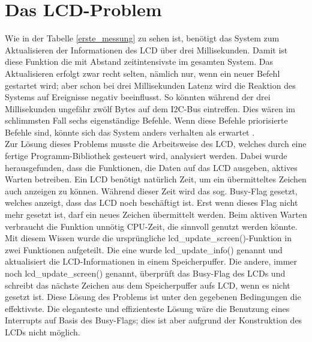 \section{Das LCD-Problem\label{chapter_lcd_problem}}
Wie in der Tabelle \ref{erste_messung} zu sehen ist, benötigt das System zum Aktualisieren der Informationen
des LCD über drei Millisekunden. Damit ist diese Funktion die mit Abstand zeitintensivste im gesamten System.
Das Aktualisieren erfolgt zwar recht selten, nämlich nur, wenn ein neuer Befehl gestartet wird; aber schon
bei drei Millisekunden Latenz wird die Reaktion des Systems auf Ereignisse negativ beeinflusst.
So könnten während der drei Millisekunden ungefähr zwölf Bytes auf dem I2C-Bus eintreffen.
Dies wären im schlimmsten Fall sechs eigenständige Befehle.
Wenn diese Befehle priorisierte Befehle sind, könnte sich das System anders verhalten als erwartet .\\
Zur Lösung dieses Problems musste die Arbeitsweise des LCD, welches durch eine fertige Programm-Bibliothek
gesteuert wird, analysiert werden. 
Dabei wurde herausgefunden, dass die Funktionen, die Daten auf das LCD ausgeben,
aktives Warten betreiben. Ein LCD benötigt natürlich Zeit, um ein übermitteltes Zeichen auch anzeigen zu können.
Während dieser Zeit wird das sog. Busy-Flag gesetzt, welches anzeigt, dass das LCD noch beschäftigt ist. Erst
wenn dieses Flag nicht mehr gesetzt ist, darf ein neues Zeichen übermittelt werden. Beim aktiven Warten verbraucht die
Funktion unnötig CPU-Zeit, die sinnvoll genutzt werden könnte.\\
Mit diesem Wissen wurde die ursprüngliche lcd\_\-update\_\-screen()-Funktion in zwei Funktionen aufgeteilt. Die eine
wurde lcd\_\-update\_\-info() genannt und aktualisiert die LCD-Informationen in einem Speicherpuffer. Die andere,
immer noch lcd\_\-update\_\-screen() genannt, überprüft das Busy-Flag des LCDs und schreibt das nächste Zeichen aus
dem Speicherpuffer aufs LCD, wenn es nicht gesetzt ist. Diese Lösung des Problems ist unter den gegebenen Bedingungen
die effektivste. Die eleganteste und effizienteste Lösung wäre die Benutzung eines Interrupts auf Basis des Busy-Flags;
dies ist aber aufgrund der Konstruktion des LCDs nicht möglich.
